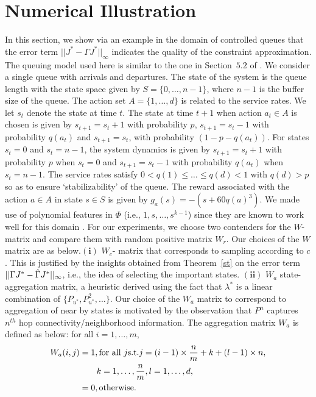 \section{Numerical Illustration}
In this section, we show via an example in the domain of controlled queues \cite{ALP}  that the error term $||J^*-\Gamma J^* ||_\infty$ indicates the quality of the constraint approximation. The queuing model used here is similar to the one in Section~$5.2$ of \cite{ALP}. We consider a single queue with arrivals and departures. The state of the system is the queue length with the state space given by $S=\{0,\ldots,n-1\}$, where $n-1$ is the buffer size of the queue. The action set $A=\{1,\ldots,d\}$ is related to the service rates. We let $s_t$ denote the state at time $t$. The state at time $t+1$ when action $a_t \in A $ is chosen is given by $s_{t+1}= s_{t}+1$ with probability $p$, $s_{t+1}= s_{t}-1$ with probability $q(a_t)$ and $s_{t+1}= s_t$, with probability $(1-p-q(a_t))$. For states $s_t=0$ and $s_t=n-1$, the system dynamics is given by 	$s_{t+1}= s_{t}+1$ with probability $p$ when $s_t=0$ and $s_{t+1}=s_t-1$ with probability $q(a_t)$ when $s_t=n-1$. The service rates satisfy $0<q(1)\leq \ldots\leq q(d)<1$ with $q(d)>p$ so as to ensure `stabilizability' of the queue. The reward associated with the action $a \in A$ in state $s\in S$ is given by $g_a(s)=-(s+60q(a)^3)$. We made use of polynomial features in $\Phi$ (i.e., $1,s,\ldots,s^{k-1}$) since they are known to work well for this domain \cite{ALP}.
For our experiments, we choose two contenders for the $W$-matrix and compare them with random positive matrix $W_r$. Our choices of the $W$ matrix are as below.{$\mathbf{(i)}$} $W_c$- matrix that corresponds to sampling according to $c$. This is justified by the insights obtained from Theorem~\ref{st} on the error term $||\Gamma J^*-\hat{\Gamma} J^*||_\infty$, i.e., the idea of selecting the important states. {$\mathbf{(ii)}$} $W_a$ state-aggregation matrix, a heuristic derived using the fact that $\lambda^*$ is a linear combination of $\{P_{u^*},P^2_{u^*},\ldots\}$. Our choice of the $W_a$ matrix to correspond to aggregation of near by states is motivated by the observation that $P^n$ captures $n^{th}$ hop connectivity/neighborhood information. 
The aggregation matrix $W_a$ is defined as below: for all $ i=1,\ldots,m$,
\begin{align}\label{wdes}
W_a(i,j)&=1, \mb\text{for all } j\mb\text{s.t.}\mb j=(i-1)\times\frac{n}{m}+k+(l-1)\times n, \nn\\&\mb\quad\quad k=1,\ldots,\frac{n}{m}, l=1,\ldots,d,\nn\\
&=0,\mb\text{otherwise}.
\end{align}
